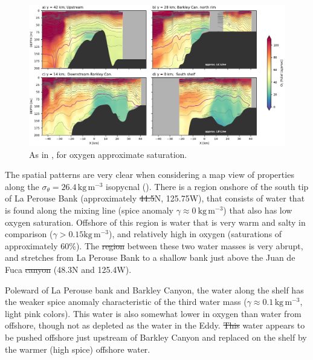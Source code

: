 \documentclass[draft]{agujournal2019}
\newcommand*{\Eddy}{{\sc Eddy}}
\providecommand{\DIFadd}[1]{{\protect\color{blue}\uwave{#1}}} %
\providecommand{\DIFdel}[1]{{\protect\color{red}\sout{#1}}}                      %
\providecommand{\DIFaddbegin}{} %
\providecommand{\DIFaddend}{} %
\providecommand{\DIFdelbegin}{} %
\providecommand{\DIFdelend}{} %
\begin{document}
\begin{figure}[htbp]
  \begin{center}
    \includegraphics[width=6.2in]{CrossSectionsO2}
    \caption{As in , for oxygen approximate saturation.
      \label{fig:CrossSectionsO2} }
  \end{center}
\end{figure}

The spatial patterns are very clear when considering a map view of properties along the $\sigma_{\theta} = 26.4\,\mathrm{kg\,m^{-3}}$ isopycnal ().  There is a region onshore of the south tip of La Perouse Bank (approximately \DIFdelbegin \DIFdel{44.5}\DIFdelend \DIFaddbegin \DIFadd{48.5}\DIFaddend \textdegree N, 125.75\textdegree W), that consists of water that is found along the mixing line (spice anomaly $\gamma \approx 0\ \mathrm{kg\,m^{-3}}$) that also has low oxygen saturation.  Offshore of this region is water that is very warm and salty in comparison ($\gamma > 0.15 \mathrm{kg\,m^{-3}}$), and relatively high in oxygen (saturations of approximately 60\%).  The \DIFdelbegin \DIFdel{region }\DIFdelend \DIFaddbegin \DIFadd{transition }\DIFaddend between these two water masses is very abrupt, and  stretches from La Perouse Bank to a shallow bank just above the Juan de Fuca \DIFdelbegin \DIFdel{canyon }\DIFdelend \DIFaddbegin \DIFadd{Canyon }\DIFaddend (48.3\textdegree N and 125.4\textdegree W).

Poleward of La Perouse bank and Barkley Canyon, the water along the shelf has the weaker spice anomaly characteristic of the third water mass ($\gamma \approx 0.1\,\mathrm{kg\,m^{-3}}$, light pink colors).  This water is also somewhat lower in oxygen than water from offshore, though not as depleted as the water in the \Eddy.  \DIFdelbegin \DIFdel{This }\DIFdelend \DIFaddbegin \DIFadd{The }\DIFaddend water appears to be pushed offshore just upstream of Barkley Canyon and replaced on the shelf by the warmer (high spice) offshore water.
\end{document}
